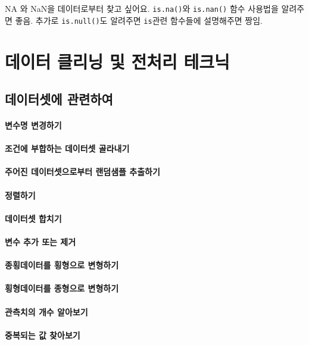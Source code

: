 \documentclass{report}
\begin{document}
NA 와 NaN을 데이터로부터 찾고 싶어요. 
\texttt{is.na()}와 \texttt{is.nan()} 함수 사용법을 알려주면 좋음.  추가로 \texttt{is.null()}도 알려주면 \texttt{is}관련 함수들에 설명해주면 짱임.

\section{데이터 클리닝 및 전처리 테크닉}

\subsection{데이터셋에 관련하여}

\paragraph{변수명 변경하기}
\paragraph{조건에 부합하는 데이터셋 골라내기}
\paragraph{주어진 데이터셋으로부터 랜덤샘플 추출하기}
\paragraph{정렬하기}
\paragraph{데이터셋 합치기}
\paragraph{변수 추가 또는 제거}
\paragraph{종횡데이터를 횡형으로 변형하기}
\paragraph{횡형데이터를 종형으로 변형하기}
\paragraph{관측치의 개수 알아보기}
\paragraph{중복되는 값 찾아보기}
\end{document}
